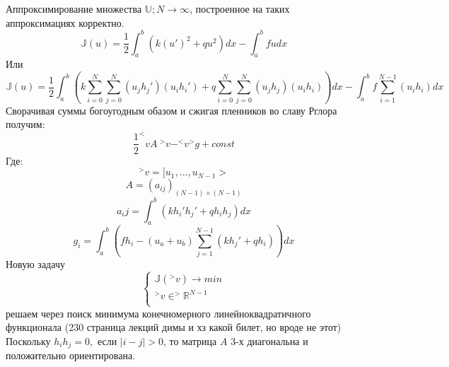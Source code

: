 \documentclass[__main__.tex]{subfiles}
\begin{document}
Аппроксимирование множества $\mathbb{U}; N\rightarrow\infty$, построенное на таких аппроксимациях корректно.\\

$$\mathbb{J}(u)=\frac{1}{2}\int_a^b(k(u')^2+qu^2)dx-\int_a^b fu dx$$ 
Или 
$$\mathbb{J}(u)=\frac{1}{2}\int_a^b(k\sum_{i=0}^{N}\sum_{j=0}^{N}(u_j h_j')(u_i h_i')+q\sum_{i=0}^{N}\sum_{j=0}^{N}(u_j h_j)(u_i h_i))dx-\int_a^b f\sum_{i=1}^{N-1}(u_i h_i) dx$$
Сворачивая суммы богоугодным обазом и сжигая пленников во славу Рглора получим:
$$\frac{1}{2}^<v A\ ^>v-^<v^>g+const$$
Где:
$$^>v=[u_1,...,u_{N-1}>$$
$$A=(a_{ij})_{(N-1)\times(N-1)}$$
$$a_ij=\int_a^b(kh_i'h_j'+qh_i h_j)dx$$
$$g_i=\int_a^b(f h_i-(u_a+u_b)\sum_{j=1}^{N-1}(kh_j'+qh_i))dx$$
Новую задачу 
\begin{equation}
\begin{cases}
\mathbb{J}(^>v)\rightarrow min\\
^>v\in ^>\mathbb{R}^{N-1}\\
\end{cases}
\end{equation}
решаем через поиск минимума конечномерного линейноквадратичного функционала (230 страница лекций димы и хз какой билет, но вроде не этот)\\

Поскольку $h_ih_j=0,$ если $|i-j|>0$, то матрица $A$ 3-х диагональна и положительно ориентирована.
\end{document}
